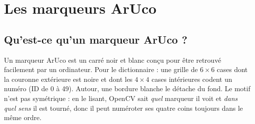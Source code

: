 \documentclass[11pt,a4paper]{article}
\newcommand{\code}[1]{\texttt{\detokenize{#1}}}
\begin{document}
\section{Les marqueurs ArUco}

\subsection{Qu'est-ce qu'un marqueur ArUco ?}

Un marqueur ArUco est un carré noir et blanc conçu pour être retrouvé facilement par un ordinateur. Pour le
dictionnaire \code{DICT_4X4_50} : une grille de $6\times6$ cases dont la couronne extérieure est noire et dont
les $4\times4$ cases intérieures codent un numéro (ID de 0 à 49). Autour, une bordure blanche le détache du
fond. Le motif n'est pas symétrique : en le lisant, OpenCV sait \emph{quel} marqueur il voit et \emph{dans
quel sens} il est tourné, donc il peut numéroter ses quatre coins toujours dans le même ordre.
\end{document}
